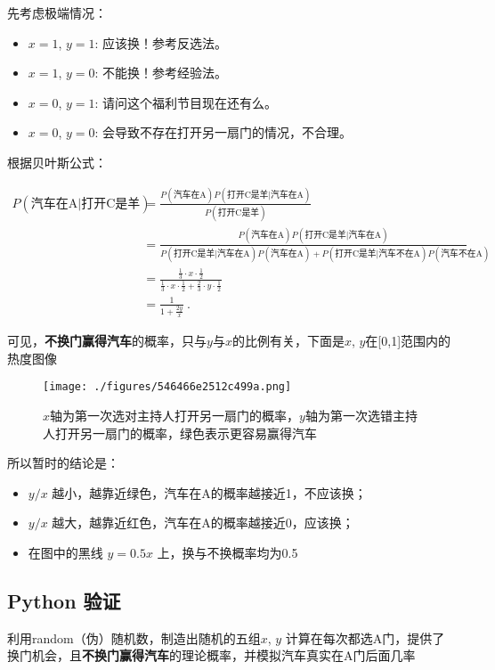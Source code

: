 先考虑极端情况：

\begin{itemize}
\item $x = 1$, $y = 1$: 应该换！参考反选法。
\item $x = 1$, $y = 0$: 不能换！参考经验法。
\item $x = 0$, $y = 1$: 请问这个福利节目现在还有么。
\item $x = 0$, $y = 0$: 会导致不存在打开另一扇门的情况，不合理。
\end{itemize}

根据贝叶斯公式：

\begin{align}
\nonumber
P(\text{汽车在A}|\text{打开C是羊})&=\frac{P(\text{汽车在A})P(\text{打开C是羊}|\text{汽车在A})}{P(\text{打开C是羊})}\\
\nonumber
&=\frac{P(\text{汽车在A})P(\text{打开C是羊}|\text{汽车在A})}{P(\text{打开C是羊}|\text{汽车在A})P(\text{汽车在A})+P(\text{打开C是羊}|\text{汽车不在A})P(\text{汽车不在A})}\\
\nonumber
&=\frac{\frac{1}{3}\cdot x\cdot \frac{1}{2}}{\frac{1}{3}\cdot x\cdot \frac{1}{2}+\frac{2}{3}\cdot y\cdot \frac{1}{2}}\\
\nonumber
&=\frac{1}{1+\frac{2y}{x}}~.
\end{align}

可见，\textbf{不换门赢得汽车}的概率，只与$y$与$x$的比例有关，下面是$x$, $y$在[0,1]范围内的热度图像

\begin{figure}[ht]
\centering
\texttt{[image: ./figures/546466e2512c499a.png]}
\caption{$x$轴为第一次选对主持人打开另一扇门的概率，$y$轴为第一次选错主持人打开另一扇门的概率，绿色表示更容易赢得汽车} \label {fig_MontyH}
\end{figure}

所以暂时的结论是：

\begin{itemize}
\item $y/x$ 越小，越靠近绿色，汽车在A的概率越接近1，不应该换；
\item $y/x$ 越大，越靠近红色，汽车在A的概率越接近0，应该换；
\item 在图中的黑线 $y=0.5x$ 上，换与不换概率均为0.5
\end{itemize}

\subsection{Python 验证}
利用random（伪）随机数，制造出随机的五组$x$, $y$ 计算在每次都选A门，提供了换门机会，且\textbf{不换门赢得汽车}的理论概率，并模拟汽车真实在A门后面几率

